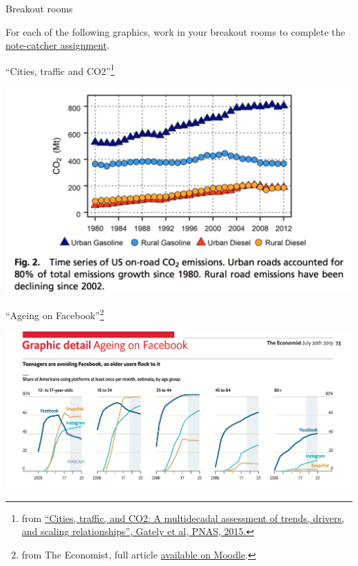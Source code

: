 \documentclass[table]{beamer}\usepackage[]{graphicx}\usepackage[]{color}
\begin{document}

\begin{frame}{Breakout rooms}

\Large 
For each of the following graphics, work in your breakout rooms to complete the \href{https://docs.google.com/presentation/d/14EFDPtJFJVQCAUWZHCyziDE-DAsJJskMO4zEAZwHiwk/edit#slide=id.gbb67dd5f83_0_4}{note-catcher assignment}.
 
\end{frame}



\begin{frame}{``Cities, traffic and CO2''\footnote{from \href{http://www.pnas.org/content/112/16/4999.full.pdf}{``Cities, traffic, and CO2: A multidecadal assessment of trends, drivers, and scaling relationships'', Gately et al, PNAS, 2015.}}}

\includegraphics[width=\textwidth]{figure-static/pollution.png}

\end{frame}



\begin{frame}{``Ageing on Facebook''\footnote{from The Economist, full article \href{https://moodle.umass.edu/mod/resource/view.php?id=2663552}{available on Moodle}.}}

\includegraphics[width=\textwidth]{../lecture1-story-examples/figure-static/graphic-detail-ageing-facebook.png}

\end{frame}
\end{document}
